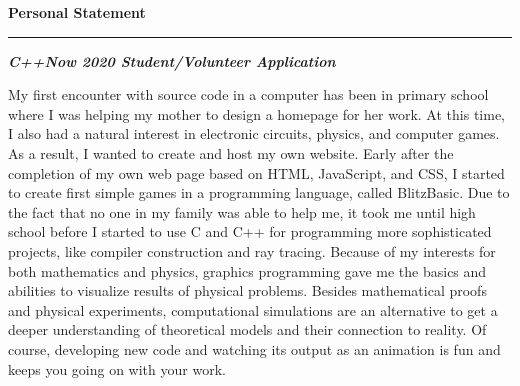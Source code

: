\documentclass[ 10pt]{article}
\begin{document}
\sffamily
\pagestyle{cvPagestyle}
  \smallskip%
  {%
    \normalfont%
    \Large%
    \color{cvColor}%
    \bfseries%
    \sffamily%
    \noindent%
    Personal Statement%
  }\\[-0.5em]
  \rule{\linewidth}{0.8pt}%
  \par%
  \smallskip%
  \begin{tcolorbox}[left=0pt, top=0pt, bottom=0pt, right=0pt, boxsep=3pt, arc=5pt, frame code={}, colback=cvBackgroundColor]
    \normalfont%
    \sffamily%
    \itshape%
    \bfseries%
    \color{cvSubsectionColor}%
    \hfill C++Now 2020 Student/Volunteer Application%
  \end{tcolorbox}
  \medskip

  \noindent
  My first encounter with source code in a computer has been in primary school where I was helping my mother to design a homepage for her work.
  At this time, I also had a natural interest in electronic circuits, physics, and computer games.
  As a result, I wanted to create and host my own website.
  Early after the completion of my own web page based on HTML, JavaScript, and CSS, I started to create first simple games in a programming language, called BlitzBasic.
  Due to the fact that no one in my family was able to help me, it took me until high school before I started to use C and C++ for programming more sophisticated projects, like compiler construction and ray tracing.
  Because of my interests for both mathematics and physics, graphics programming gave me the basics and abilities to visualize results of physical problems.
  Besides mathematical proofs and physical experiments, computational simulations are an alternative to get a deeper understanding of theoretical models and their connection to reality.
  Of course, developing new code and watching its output as an animation is fun and keeps you going on with your work.
\end{document}
